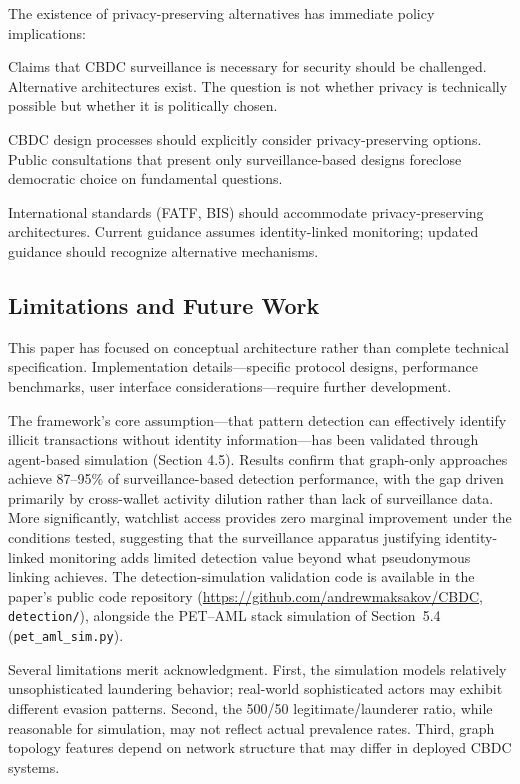 \documentclass[11pt]{article}
\begin{document}
The existence of privacy-preserving alternatives has immediate policy implications:

Claims that CBDC surveillance is necessary for security should be challenged. Alternative architectures exist. The question is not whether privacy is technically possible but whether it is politically chosen.

CBDC design processes should explicitly consider privacy-preserving options. Public consultations that present only surveillance-based designs foreclose democratic choice on fundamental questions.

International standards (FATF, BIS) should accommodate privacy-preserving architectures. Current guidance assumes identity-linked monitoring; updated guidance should recognize alternative mechanisms.

\subsection{Limitations and Future Work}
\label{sec:limitations}

This paper has focused on conceptual architecture rather than complete technical specification. Implementation details---specific protocol designs, performance benchmarks, user interface considerations---require further development.

The framework's core assumption---that pattern detection can effectively identify illicit transactions without identity information---has been validated through agent-based simulation (Section 4.5). Results confirm that graph-only approaches achieve 87--95\% of surveillance-based detection performance, with the gap driven primarily by cross-wallet activity dilution rather than lack of surveillance data. More significantly, watchlist access provides zero marginal improvement under the conditions tested, suggesting that the surveillance apparatus justifying identity-linked monitoring adds limited detection value beyond what pseudonymous linking achieves. The detection-simulation validation code is available in the paper's public code repository (\url{https://github.com/andrewmaksakov/CBDC}, \texttt{detection/}), alongside the PET--AML stack simulation of Section~5.4 (\texttt{pet\_aml\_sim.py}).

Several limitations merit acknowledgment. First, the simulation models relatively unsophisticated laundering behavior; real-world sophisticated actors may exhibit different evasion patterns. Second, the 500/50 legitimate/launderer ratio, while reasonable for simulation, may not reflect actual prevalence rates. Third, graph topology features depend on network structure that may differ in deployed CBDC systems.
\end{document}
